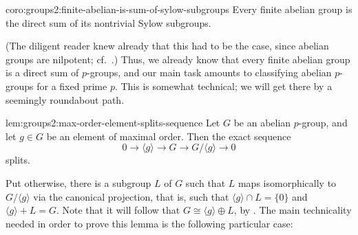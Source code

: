\begin{coro}{}{coro:groups2:finite-abelian-is-sum-of-sylow-subgroups}
  Every finite abelian group is the direct sum of its nontrivial Sylow
  subgroups.
\end{coro}
(The diligent reader knew already that this had to be the case, since
abelian groups are nilpotent; cf.\
.)  Thus,
we already know that every finite abelian group is a direct sum of
$p$-groups, and our main task amounts to classifying abelian
$p$-groups for a fixed prime $p$. This is somewhat technical; we will
get there by a seemingly roundabout path.
\begin{lem}{}{lem:groups2:max-order-element-splits-sequence}
  Let $G$ be an abelian $p$-group, and let $g \in G$ be an element of
  maximal order. Then the exact sequence
  \[0 \longrightarrow \langle g \rangle \longrightarrow G
    \longrightarrow G/\langle g \rangle \longrightarrow 0\] splits.
\end{lem}

Put otherwise, there is a subgroup $L$ of $G$ such that $L$ maps
isomorphically to $G/\langle g \rangle$ via the canonical projection,
that is, such that $\langle g \rangle \cap L = \{0\}$ and
$\langle g \rangle + L = G$. Note that it will follow that
$G \cong \langle g \rangle \oplus L$, by .  The
main technicality needed in order to prove this lemma is the following
particular case:

